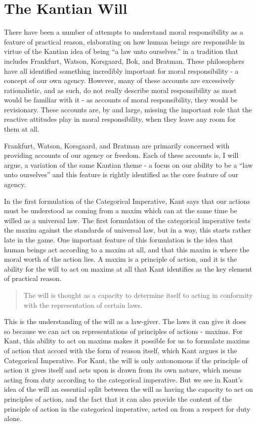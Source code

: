 \documentclass[phd,12pt,oneside,paper=letterpaper]{ubcthesis}
\begin{document}
\section{The Kantian Will}
There have been a number of attempts to understand moral responsibility as a feature of practical reason, elaborating on how human beings are responsible in virtue of the Kantian idea of being ``a law unto ourselves.'' in a tradition that includes Frankfurt, Watson, Korsgaard, Bok, and Bratman. These philosophers have all identified something incredibly important for moral responsibility - a concept of our own agency. However, many of these accounts are excessively rationalistic, and as such, do not really describe moral responsibility as most would be familiar with it - as accounts of moral responsibility, they would be revisionary. These accounts are, by and large, missing the important role that the reactive attitudes play in moral responsibility, when they leave any room for them at all. 

Frankfurt, Watson, Korsgaard, and Bratman are primarily concerned with providing accounts of our agency or freedom. Each of these accounts is, I will argue, a variation of the same Kantian theme - a focus on our ability to be a ``law unto ourselves'' and this feature is rightly identified as the core feature of our agency. 

In the first formulation of the Categorical Imperative, Kant says that our actions must be understood as coming from a maxim which can at the same time be willed as a universal law. The first formulation of the categorical imperative tests the maxim against the standards of universal law, but in a way, this starts rather late in the game. One important feature of this formulation is the idea that human beings act according to a maxim at all, and that this maxim is where the moral worth of the action lies. A maxim is a principle of action, and it is the ability for the will to act on maxims at all that Kant identifies as the key element of practical reason. 

\begin{quote}
The will is thought as a capacity to determine itself to acting in conformity with the representation of certain laws. \citep[78]{kant1998}
\end{quote}

This is the understanding of the will as a law-giver. The laws it can give it does so because we can act on representations of principles of actions - maxims. For Kant, this ability to act on maxims makes it possible for us to formulate maxims of action that accord with the form of reason itself, which Kant argues is the Categorical Imperative. For Kant, the will is only autonomous if the principle of action it gives itself and acts upon is drawn from its own nature, which means acting from duty according to the categorical imperative. But we see in Kant's idea of the will an essential split between the will as having the capacity to act on principles of action, and the fact that it can also provide the content of the principle of action in the categorical imperative, acted on from a respect for duty alone. 
\end{document}
